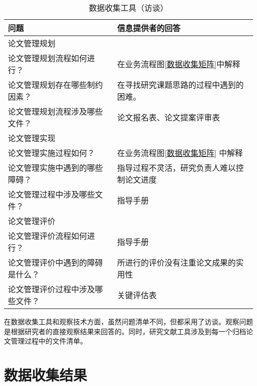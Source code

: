 \begin{table}[htbp]
      \centering
      \song\wuhao
      \caption{数据收集工具（访谈）}
      \label{数据收集工具访谈}
      \begin{tabular}{ll}
            \hline
            问题                             & 信息提供者的回答                           \\ \hline
            \multicolumn{2}{l}{论文管理规划}                                              \\ \hline
            论文管理规划流程如何进行？       & 在业务流程图\ref{数据收集矩阵}中解释       \\
            论文管理规划存在哪些制约因素？   & 在寻找研究课题思路的过程中遇到的困难。     \\
            论文管理规划流程涉及哪些文件？   & 论文报名表、论文提案评审表                 \\ \hline
            \multicolumn{2}{l}{论文管理实现}                                              \\ \hline
            论文管理实施过程如何？           & 在业务流程图\ref{数据收集矩阵} 中解释      \\
            论文管理实施中遇到的哪些障碍？   & 指导过程不灵活，研究负责人难以控制论文进度 \\
            论文管理过程中涉及哪些文件？     & 指导手册                                   \\ \hline
            \multicolumn{2}{l}{论文管理评价}                                              \\ \hline
            论文管理评价流程如何进行？       & 指导手册                                   \\
            论文管理评价中遇到的障碍是什么？ & 所进行的评价没有注重论文成果的实用性       \\
            论文管理评价过程中涉及哪些文件？ & 关键评估表                                 \\ \hline
      \end{tabular}
\end{table}

在数据收集工具和观察技术方面，虽然问题清单不同，但都采用了访谈。观察问题是根据研究者的直接观察结果来回答的。同时，研究文献工具涉及到每一个归档论文管理过程中的文件清单。

\section{数据收集结果}

